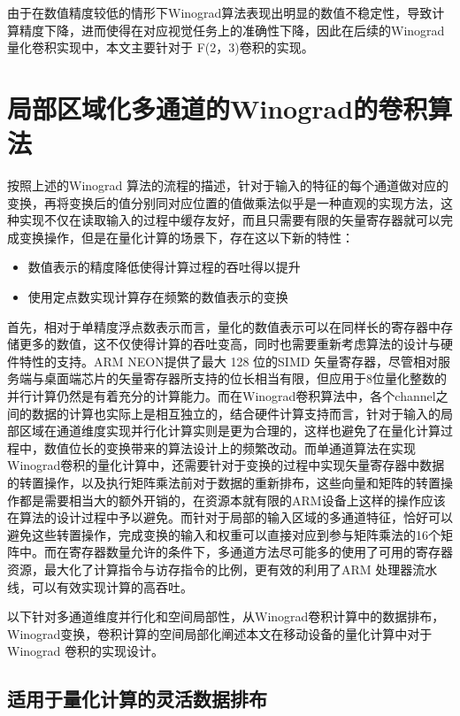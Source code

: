由于在数值精度较低的情形下Winograd算法表现出明显的数值不稳定性，导致计算精度下降，进而使得在对应视觉任务上的准确性下降，因此在后续的Winograd 量化卷积实现中，本文主要针对于 F(2，3)卷积的实现。

\section{局部区域化多通道的Winograd的卷积算法}

按照上述的Winograd 算法的流程的描述，针对于输入的特征的每个通道做对应的变换，再将变换后的值分别同对应位置的值做乘法似乎是一种直观的实现方法，这种实现不仅在读取输入的过程中缓存友好，而且只需要有限的矢量寄存器就可以完成变换操作，但是在量化计算的场景下，存在这以下新的特性：
\begin{itemize}
  \item 数值表示的精度降低使得计算过程的吞吐得以提升
  \item 使用定点数实现计算存在频繁的数值表示的变换
\end{itemize}

首先，相对于单精度浮点数表示而言，量化的数值表示可以在同样长的寄存器中存储更多的数值，这不仅使得计算的吞吐变高，同时也需要重新考虑算法的设计与硬件特性的支持。ARM NEON提供了最大 128 位的SIMD 矢量寄存器，尽管相对服务端与桌面端芯片的矢量寄存器所支持的位长相当有限，但应用于8位量化整数的并行计算仍然是有着充分的计算能力。而在Winograd卷积算法中，各个channel之间的数据的计算也实际上是相互独立的，结合硬件计算支持而言，针对于输入的局部区域在通道维度实现并行化计算实则是更为合理的，这样也避免了在量化计算过程中，数值位长的变换带来的算法设计上的频繁改动。而单通道算法在实现Winograd卷积的量化计算中，还需要针对于变换的过程中实现矢量寄存器中数据的转置操作，以及执行矩阵乘法前对于数据的重新排布，这些向量和矩阵的转置操作都是需要相当大的额外开销的，在资源本就有限的ARM设备上这样的操作应该在算法的设计过程中予以避免。而针对于局部的输入区域的多通道特征，恰好可以避免这些转置操作，完成变换的输入和权重可以直接对应到参与矩阵乘法的16个矩阵中。而在寄存器数量允许的条件下，多通道方法尽可能多的使用了可用的寄存器资源，最大化了计算指令与访存指令的比例，更有效的利用了ARM 处理器流水线，可以有效实现计算的高吞吐。

以下针对多通道维度并行化和空间局部性，从Winograd卷积计算中的数据排布，Winograd变换，卷积计算的空间局部化阐述本文在移动设备的量化计算中对于Winograd 卷积的实现设计。

\subsection{适用于量化计算的灵活数据排布}

